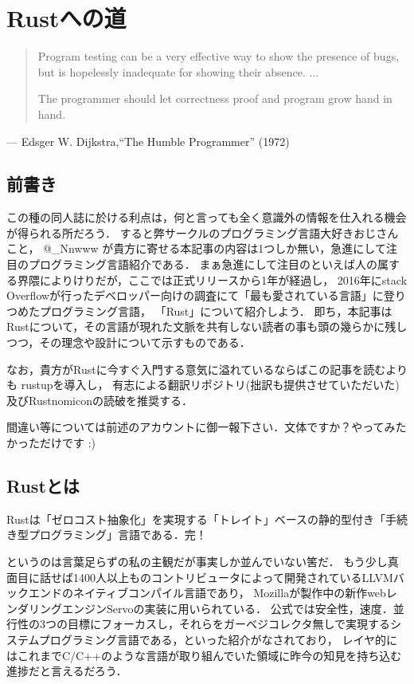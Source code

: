 \chapter{Rustへの道}
\begin{quotation}
  Program testing can be a very effective way to show the presence of bugs, \\
  but is hopelessly inadequate for showing their absence. ...

  The programmer should let correctness proof and program grow hand in hand.
\end{quotation}
\begin{flushright}
  --- Edsger W. Dijkstra,``The Humble Programmer'' (1972)
\end{flushright}

\section{前書き}
この種の同人誌に於ける利点は，何と言っても全く意識外の情報を仕入れる機会が得られる所だろう．
すると弊サークルのプログラミング言語大好きおじさんこと， @\_Nnwww が貴方に寄せる本記事の内容は1つしか無い，急進にして注目のプログラミング言語紹介である．
まぁ急進にして注目のといえば人の属する界隈によりけりだが，ここでは正式リリースから1年が経過し，
2016年にstack Overflowが行ったデベロッパー向けの調査にて「最も愛されている言語」に登りつめたプログラミング言語\cite{most_loved}，
「Rust」について紹介しよう．
即ち，本記事はRustについて，その言語が現れた文脈を共有しない読者の事も頭の幾らかに残しつつ，その理念や設計について示すものである．

なお，貴方がRustに今すぐ入門する意気に溢れているならばこの記事を読むよりも
rustup\cite{rustup}を導入し，
有志による翻訳リポジトリ\cite{rustdoc_ja}(拙訳も提供させていただいた)及びRustnomicon\cite{nomicon}の読破を推奨する．

間違い等については前述のアカウントに御一報下さい．文体ですか？やってみたかっただけです :)

\section{Rustとは}
Rustは「ゼロコスト抽象化」を実現する「トレイト」ベースの静的型付き「手続き型プログラミング」言語である．完！

というのは言葉足らずの私の主観だが事実しか並んでいない筈だ．
もう少し真面目に話せば1400人以上ものコントリビュータによって開発されているLLVMバックエンドのネイティブコンパイル言語であり，
Mozillaが製作中の新作webレンダリングエンジンServoの実装に用いられている．
公式では安全性，速度．並行性の3つの目標にフォーカスし，それらをガーベジコレクタ無しで実現するシステムプログラミング言語である，といった紹介がなされており，
レイヤ的にはこれまでC/C++のような言語が取り組んでいた領域に昨今の知見を持ち込む進捗だと言えるだろう．

